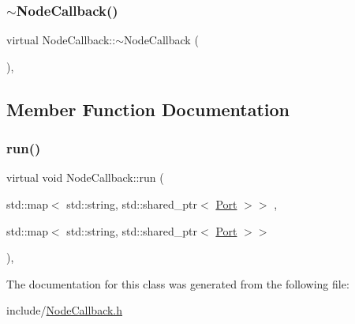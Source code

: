 \subsubsection{\texorpdfstring{$\sim$\+Node\+Callback()}{~NodeCallback()}}
{\footnotesize\ttfamily virtual Node\+Callback\+::$\sim$\+Node\+Callback (\begin{DoxyParamCaption}{ }\end{DoxyParamCaption})\hspace{0.3cm}{\ttfamily [inline]}, {\ttfamily [virtual]}}



\subsection{Member Function Documentation}
\mbox{\label{class_node_callback_a94eb8c2fd7162ffcc4abff8bd2e852b3}} 
\subsubsection{\texorpdfstring{run()}{run()}}
{\footnotesize\ttfamily virtual void Node\+Callback\+::run (\begin{DoxyParamCaption}\item[{std\+::map$<$ std\+::string, std\+::shared\+\_\+ptr$<$ \hyperlink{class_port}{Port} $>$$>$}]{,  }\item[{std\+::map$<$ std\+::string, std\+::shared\+\_\+ptr$<$ \hyperlink{class_port}{Port} $>$$>$}]{ }\end{DoxyParamCaption})\hspace{0.3cm}{\ttfamily [inline]}, {\ttfamily [virtual]}}



The documentation for this class was generated from the following file\+:\begin{DoxyCompactItemize}
\item 
include/\hyperlink{_node_callback_8h}{Node\+Callback.\+h}\end{DoxyCompactItemize}
